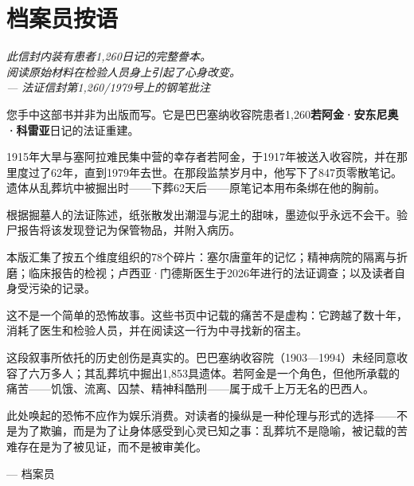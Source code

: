 \cleardoublepage
\thispagestyle{empty}
\chapter*{档案员按语}

\begin{center}
\itshape\small
此信封内装有患者1,260日记的完整誊本。\\
阅读原始材料在检验人员身上引起了心身改变。\\[0.5em]
\upshape\scriptsize --- 法证信封第1,260/1979号上的钢笔批注
\end{center}

\vspace{1.2em}

\begingroup

您手中这部书并非为出版而写。它是巴巴塞纳收容院患者1,260\textbf{若阿金·安东尼奥·科雷亚}日记的法证重建。

1915年大旱与塞阿拉难民集中营的幸存者若阿金，于1917年被送入收容院，并在那里度过了62年，直到1979年去世。在那段监禁岁月中，他写下了847页零散笔记。遗体从乱葬坑中被掘出时——下葬62天后——原笔记本用布条绑在他的胸前。

\vspace{0.4em}
\noindent 根据掘墓人的法证陈述，纸张散发出潮湿与泥土的甜味，墨迹似乎永远不会干。验尸报告将该发现登记为保管物品，并附入病历。

\vspace{0.6em}
本版汇集了按五个维度组织的78个碎片：塞尔唐童年的记忆；精神病院的隔离与折磨；临床报告的检视；卢西亚·门德斯医生于2026年进行的法证调查；以及读者自身受污染的记录。

\vspace{0.6em}
这不是一个简单的恐怖故事。这些书页中记载的痛苦不是虚构：它跨越了数十年，消耗了医生和检验人员，并在阅读这一行为中寻找新的宿主。

\vspace{1.2em}

\vspace{1.2em}
\noindent 这段叙事所依托的历史创伤是真实的。巴巴塞纳收容院（1903—1994）未经同意收容了六万多人；其乱葬坑中掘出1,853具遗体。若阿金是一个角色，但他所承载的痛苦——饥饿、流离、囚禁、精神科酷刑——属于成千上万无名的巴西人。

\vspace{0.6em}
\noindent 此处唤起的恐怖不应作为娱乐消费。对读者的操纵是一种伦理与形式的选择——不是为了欺骗，而是为了让身体感受到心灵已知之事：乱葬坑不是隐喻，被记载的苦难存在是为了被见证，而不是被审美化。

\vspace{0.6em}

\vspace{1.4em}
\hfill{\scshape --- 档案员}\hspace{1em}

\endgroup
\clearpage
